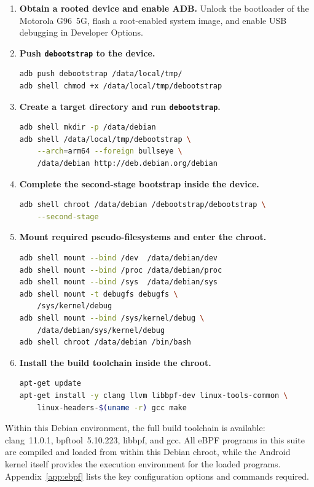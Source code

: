 \documentclass{mnitjaipur}
\begin{document}
\begin{enumerate}
  \item \textbf{Obtain a rooted device and enable ADB.} Unlock the bootloader of the Motorola G96~5G, flash a root-enabled system image, and enable USB debugging in Developer Options.

  \item \textbf{Push \texttt{debootstrap} to the device.}
  \begin{lstlisting}[language=bash]
adb push debootstrap /data/local/tmp/
adb shell chmod +x /data/local/tmp/debootstrap
  \end{lstlisting}

  \item \textbf{Create a target directory and run \texttt{debootstrap}.}
  \begin{lstlisting}[language=bash]
adb shell mkdir -p /data/debian
adb shell /data/local/tmp/debootstrap \
    --arch=arm64 --foreign bullseye \
    /data/debian http://deb.debian.org/debian
  \end{lstlisting}

  \item \textbf{Complete the second-stage bootstrap inside the device.}
  \begin{lstlisting}[language=bash]
adb shell chroot /data/debian /debootstrap/debootstrap \
    --second-stage
  \end{lstlisting}

  \item \textbf{Mount required pseudo-filesystems and enter the chroot.}
  \begin{lstlisting}[language=bash]
adb shell mount --bind /dev  /data/debian/dev
adb shell mount --bind /proc /data/debian/proc
adb shell mount --bind /sys  /data/debian/sys
adb shell mount -t debugfs debugfs \
    /sys/kernel/debug
adb shell mount --bind /sys/kernel/debug \
    /data/debian/sys/kernel/debug
adb shell chroot /data/debian /bin/bash
  \end{lstlisting}

  \item \textbf{Install the build toolchain inside the chroot.}
  \begin{lstlisting}[language=bash]
apt-get update
apt-get install -y clang llvm libbpf-dev linux-tools-common \
    linux-headers-$(uname -r) gcc make
  \end{lstlisting}
\end{enumerate}

Within this Debian environment, the full build toolchain is available: clang~11.0.1, bpftool~5.10.223, libbpf, and gcc. All eBPF programs in this suite are compiled and loaded from within this Debian chroot, while the Android kernel itself provides the execution environment for the loaded programs. Appendix~\ref{app:ebpf} lists the key configuration options and commands required.
\end{document}
